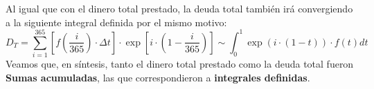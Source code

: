 \documentclass[12pt]{article}
\begin{document}
\newpage

Al igual que con el dinero total prestado, la deuda total también irá convergiendo a la siguiente integral definida por el mismo motivo:
\[
  D_{T} = \sum_{i = 1}^{365} \left[f\left(\frac{i}{365}\right) \cdot \Delta t \right] \cdot
          \exp\left[i \cdot \left(1 - \frac{i}{365}\right)\right]
        \sim \int_{0}^{1} \exp(i \cdot (1 - t)) \cdot f(t)dt
\]
Veamos que, en síntesis, tanto el dinero total prestado como la deuda total fueron \textbf{Sumas acumuladas}, las que correspondieron a \textbf{integrales definidas}.
\end{document}
